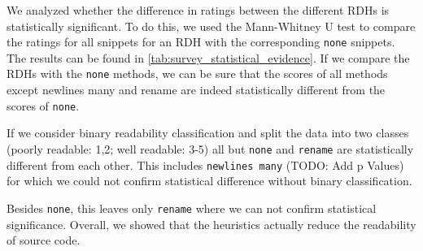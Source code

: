 \documentclass[%
class=scrreprt,
chapterprefix=false,%
open=right,%
twoside=false,%
paper=a4,%
logofile={Logo\_zentral\_farbig\_EN.png},%
thesistype=master,%
UKenglish,%
]{se2thesis}
\theoremstyle{definition}
\begin{document}
	We analyzed whether the difference in ratings between the different RDHs is statistically significant. To do this, we used the Mann-Whitney U test to compare the ratings for all snippets for an RDH with the corresponding \texttt{none} snippets. The results can be found in \autoref{tab:survey_statistical_evidence}.
	If we compare the RDHs with the \texttt{none} methods, we can be sure that the scores of all methods except newlines many and rename are indeed statistically different from the scores of \texttt{none}. 
	
	If we consider binary readability classification and split the data into two classes (poorly readable: 1,2; well readable: 3-5) all but \texttt{none} and \texttt{rename} are statistically different from each other. This includes \texttt{newlines many} (TODO: Add p Values) for which we could not confirm statistical difference without binary classification.

	Besides \texttt{none}, this leaves only \texttt{rename} where we can not confirm statistical significance. Overall, we showed that the heuristics actually reduce the readability of source code.

\end{document}
